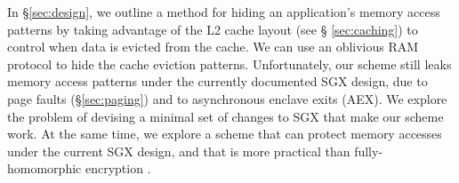 In \S \ref{sec:design}, we outline a method for hiding an application's memory
access patterns by taking advantage of the L2 cache layout (see \S
\ref{sec:caching}) to control when data is evicted from the cache. We can use
an oblivious RAM protocol \cite{stefanov2012path} to hide the cache eviction
patterns. Unfortunately, our scheme still leaks memory access patterns under
the currently documented SGX design, due to page faults (\S \ref{sec:paging})
and to asynchronous enclave exits (AEX). We explore the problem of devising a
minimal set of changes to SGX that make our scheme work. At the same time, we
explore a scheme that can protect memory accesses under the current SGX design,
and that is more practical than fully-homomorphic encryption
\cite{gentry2009fhe} \cite{naehrig2011can}.
